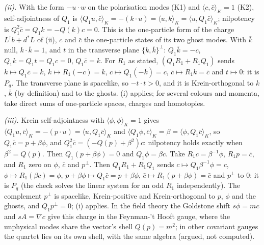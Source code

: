 \emph{(ii).} With the form $-u\cdot w$ on the polarisation modes (K1) and $\langle c, \bar c\rangle_K = 1$ (K2), self-adjointness of $Q_1$ is $\langle Q_1u, \bar c\rangle_K = -(k\cdot u) = \langle u, k\rangle_K = \langle u, Q_1\bar c\rangle_K$; nilpotency is $Q_1^2\bar c = Q_1k = -Q(k)c = 0$. This is the one-particle form of the charge $L^{\dagger}b + d^{*}L$ of (ii), $c$ and $\bar c$ the one-particle states of its two ghost modes. With $\bar k$ null, $k\cdot\bar k = 1$, and $t$ in the transverse plane $\{k, \bar k\}^{\perp}$: $Q_1\bar k = -c$, $Q_1k = Q_1t = Q_1c = 0$, $Q_1\bar c = k$. For $R_1$ as stated, $(Q_1R_1 + R_1Q_1)$ sends $k \mapsto Q_1\bar c = k$, $\bar k \mapsto R_1(-c) = \bar k$, $c \mapsto Q_1(-\bar k) = c$, $\bar c \mapsto R_1k = \bar c$ and $t \mapsto 0$: it is $P_{q}$. The transverse plane is spacelike, so $-t\cdot t > 0$, and it is Krein-orthogonal to $k$, $\bar k$ (by definition) and to the ghosts. (i) applies; for several colours and momenta, take direct sums of one-particle spaces, charges and homotopies.

\emph{(iii).} Krein self-adjointness with $\langle\phi, \phi\rangle_K = 1$ gives $\langle Q_1u, \bar c\rangle_K = -(p\cdot u) = \langle u, Q_1\bar c\rangle_K$ and $\langle Q_1\phi, \bar c\rangle_K = \beta = \langle\phi, Q_1\bar c\rangle_K$, so $Q_1\bar c = p + \beta\phi$, and $Q_1^2\bar c = (-Q(p) + \beta^2)c$: nilpotency holds exactly when $\beta^2 = Q(p)$. Then $Q_1(p + \beta\phi) = 0$ and $Q_1\phi = \beta c$. Take $R_1c = \beta^{-1}\phi$, $R_1p = \bar c$, and $R_1$ zero on $\phi$, $\bar c$ and $p^{\perp}$. Then $Q_1R_1 + R_1Q_1$ sends $c \mapsto Q_1\beta^{-1}\phi = c$, $\phi \mapsto R_1(\beta c) = \phi$, $p + \beta\phi \mapsto Q_1\bar c = p + \beta\phi$, $\bar c \mapsto R_1(p + \beta\phi) = \bar c$ and $p^{\perp}$ to $0$: it is $P_{q}$ (the check solves the linear system for an odd $R_1$ independently). The complement $p^{\perp}$ is spacelike, Krein-positive and Krein-orthogonal to $p$, $\phi$ and the ghosts, and $Q_1p^{\perp} = 0$; (i) applies. In the field theory the Goldstone shift $s\phi = mc$ and $sA = \nabla c$ give this charge in the Feynman-'t Hooft gauge, where the unphysical modes share the vector's shell $Q(p) = m^2$; in other covariant gauges the quartet lies on its own shell, with the same algebra (argued, not computed).

